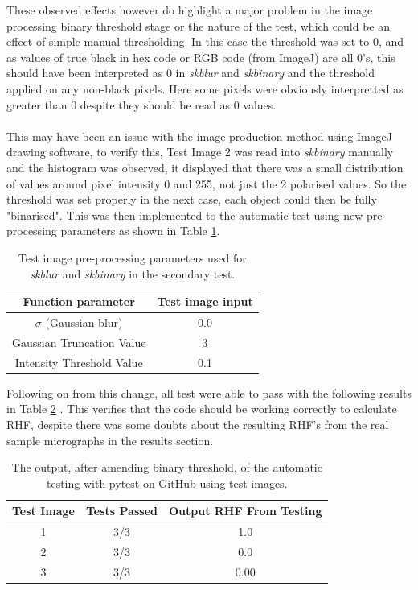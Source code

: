 \documentclass{article}
\begin{document}
    These observed effects however do highlight a major problem in the image processing binary threshold stage or the nature of the test, which could be an effect of simple manual thresholding. In this case the threshold was set to 0, and as values of true black in hex code or RGB code (from ImageJ) are all 0's, this should have been interpreted as 0 in \textit{skblur} and \textit{skbinary} and the threshold applied on any non-black pixels. Here some pixels were obviously interpretted as greater than 0 despite they should be read as 0 values. 
    \\
    \\
    This may have been an issue with the image production method using ImageJ drawing software, to verify this, Test Image 2 was read into \textit{skbinary} manually and the histogram was observed, it displayed that there was a small distribution of values around pixel intensity 0 and 255, not just the 2 polarised values. So the threshold was set properly in the next case, each object could then be fully "binarised". This was then implemented to the automatic test using new pre-processing parameters as shown in Table \ref{tab:TestImageTable2}.
    
    \begin{table}[h]
        \centering
        \begin{tabular}{|c|c|}
        \hline
            \textbf{Function parameter} & \textbf{Test image input}  \\
            \hline
            $\sigma$ (Gaussian blur) & 0.0 \\
            \hline
            Gaussian Truncation Value & 3 \\
            \hline
            Intensity Threshold Value & 0.1 \\ 
        \hline
        \end{tabular}
    \caption{Test image pre-processing parameters used for \textit{skblur} and \textit{skbinary} in the secondary test.}
    \label{tab:TestImageTable2}
    \end{table}
    Following on from this change, all test were able to pass with the following results in Table \ref{TestResults2} . This verifies that the code should be working correctly to calculate RHF, despite there was some doubts about the resulting RHF's from the real sample micrographs in the results section.
    
    \begin{table}[h]
    \centering
    \begin{tabular}{|c|c|c|}
    \hline
        \textbf{Test Image} & \textbf{Tests Passed} & \textbf{Output RHF From Testing}  \\
        \hline
        1 & 3/3 & 1.0 \\
        \hline
        2 & 3/3 & 0.0 \\
        \hline
        3 & 3/3 & 0.00 \\
        \hline
    \end{tabular}
    \caption{The output, after amending binary threshold, of the automatic testing with pytest on GitHub using test images.}
    \label{TestResults2}
\end{table}
    
\end{document}
